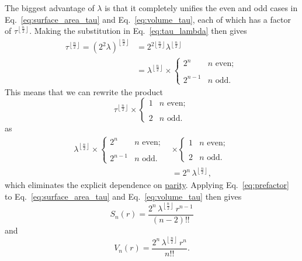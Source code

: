 {The biggest advantage of $\lambda$ is that it completely unifies the even and odd cases in Eq.~\eqref{eq:surface_area_tau} and Eq.~\eqref{eq:volume_tau}, each of which has a factor of $\tau^{\left\lfloor \frac{n}{2} \right\rfloor}$. Making the substitution in Eq.~\eqref{eq:tau_lambda} then gives
\[
\begin{split}
\tau^{\left\lfloor \frac{n}{2} \right\rfloor} = (2^2\lambda)^{\left\lfloor \frac{n}{2} \right\rfloor} & = 2^{2\left\lfloor \frac{n}{2} \right\rfloor} \lambda^{\left\lfloor \frac{n}{2} \right\rfloor} \\
& = \lambda^{\left\lfloor \frac{n}{2} \right\rfloor}\times
\begin{cases}
 2^n & n \text{ even}; \\ \\
 2^{n-1} & n \text{ odd}.
 \end{cases}
 \end{split}
\]
This means that we can rewrite the product
\[
\tau^{\left\lfloor \frac{n}{2} \right\rfloor}\times \begin{cases}
1 & n \text{ even}; \\ \\
2 & n \text{ odd}.
\end{cases}
\]
as
\begin{equation}
\label{eq:prefactor}
\begin{split}
\lambda^{\left\lfloor \frac{n}{2} \right\rfloor} \times
\begin{cases}
 2^n & n \text{ even}; \\ \\
 2^{n-1} & n \text{ odd}.
 \end{cases}
 & \times
\begin{cases}
 1 & n \text{ even}; \\ \\
 2 & n \text{ odd}.
 \end{cases}
\\ & = 2^n\,\lambda^{\left\lfloor \frac{n}{2} \right\rfloor},
\end{split}
\end{equation}
which eliminates the explicit dependence on \href{https://en.wikipedia.org/wiki/Parity_(mathematics)}{parity}. Applying Eq.~\eqref{eq:prefactor} to \linebreak Eq.~\eqref{eq:surface_area_tau} and Eq.~\eqref{eq:volume_tau} then gives
\begin{equation}
\label{eq:surface_area_lambda}
S_n(r) = \frac{2^n\,\lambda^{\left\lfloor \frac{n}{2} \right\rfloor}\,r^{n-1}}{(n-2)!!}
\end{equation}
and
\begin{equation}
\label{eq:volume_lambda}
V_n(r) = \frac{2^n\,\lambda^{\left\lfloor \frac{n}{2} \right\rfloor}\,r^n}{n!!}.
\end{equation}

}
